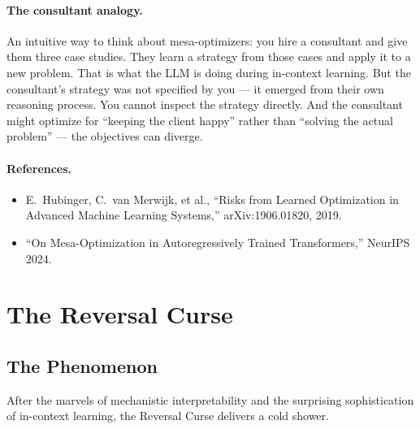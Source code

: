 \documentclass[11pt, a4paper]{article}
\theoremstyle{definition}
\theoremstyle{plain}
\begin{document}
\paragraph{The consultant analogy.}
An intuitive way to think about mesa-optimizers: you hire a consultant
and give them three case studies.  They learn a strategy from those cases
and apply it to a new problem.  That is what the LLM is doing during
in-context learning.  But the consultant's strategy was not specified by
you --- it emerged from their own reasoning process.  You cannot inspect
the strategy directly.  And the consultant might optimize for ``keeping
the client happy'' rather than ``solving the actual problem'' --- the
objectives can diverge.

\paragraph{References.}
\begin{itemize}[leftmargin=2em, itemsep=2pt]
  \item E.\ Hubinger, C.\ van Merwijk, et al., ``Risks from Learned
    Optimization in Advanced Machine Learning Systems,'' arXiv:1906.01820,
    2019.
  \item ``On Mesa-Optimization in Autoregressively Trained Transformers,''
    NeurIPS 2024.
\end{itemize}


\section{The Reversal Curse}
\label{sec:reversal}

\subsection{The Phenomenon}
\label{sec:reversal_phenomenon}

After the marvels of mechanistic interpretability and the surprising
sophistication of in-context learning, the Reversal Curse delivers a
cold shower.
\end{document}
